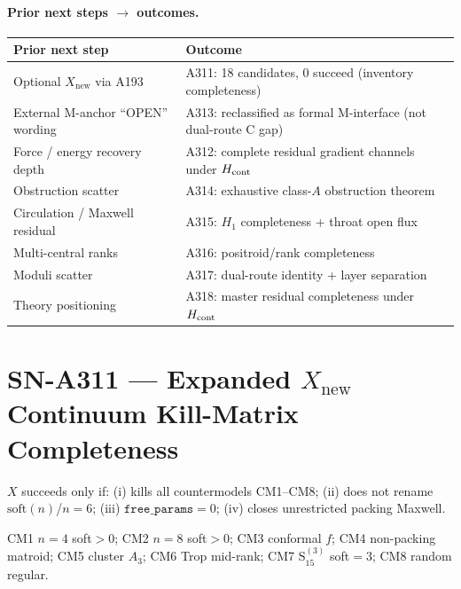 \paragraph{Prior next steps $\to$ outcomes.}
\begin{center}
\begin{tabular}{@{}p{4.5cm}p{7.5cm}@{}}
\toprule
Prior next step & Outcome \\
\midrule
Optional $X_{\mathrm{new}}$ via A193 & A311: 18 candidates, 0 succeed (inventory completeness) \\
External M-anchor ``OPEN'' wording & A313: reclassified as formal M-interface (not dual-route C gap) \\
Force / energy recovery depth & A312: complete residual gradient channels under $H_{\rm cont}$ \\
Obstruction scatter & A314: exhaustive class-$A$ obstruction theorem \\
Circulation / Maxwell residual & A315: $H_1$ completeness + throat open flux \\
Multi-central ranks & A316: positroid/rank completeness \\
Moduli scatter & A317: dual-route identity + layer separation \\
Theory positioning & A318: master residual completeness under $H_{\rm cont}$ \\
\bottomrule
\end{tabular}
\end{center}

\section{SN-A311 --- Expanded $X_{\mathrm{new}}$ Continuum Kill-Matrix Completeness}
\label{sec:SN-A311}

\begin{definition}
\label{def:A311-success}
$X$ succeeds only if: (i) kills all countermodels CM1--CM8; (ii) does not rename $\mathrm{soft}(n)$/$n{=}6$;
(iii) $\texttt{free\_params}=0$; (iv) closes unrestricted packing Maxwell.
\end{definition}

\begin{definition}
CM1 $n{=}4$ soft$>0$; CM2 $n{=}8$ soft$>0$; CM3 conformal $f$; CM4 non-packing matroid;
CM5 cluster $A_3$; CM6 Trop mid-rank; CM7 $\mathrm{S}_{15}^{(3)}$ soft${=}3$; CM8 random regular.
\end{definition}

